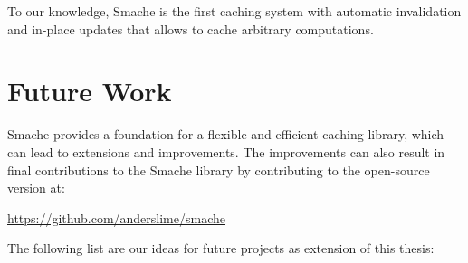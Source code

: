 To our knowledge, Smache is the first caching system with automatic invalidation and in-place updates that allows to cache arbitrary computations.

\section{Future Work}
\label{sec:future_work}

Smache provides a foundation for a flexible and efficient caching library, which can lead to extensions and improvements. The improvements can also result in final contributions to the Smache library by contributing to the open-source version at:

\url{https://github.com/anderslime/smache}

The following list are our ideas for future projects as extension of this thesis:

